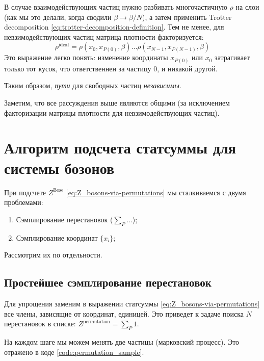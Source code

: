 \begin{lecture}
    В случае взаимодействующих частиц нужно разбивать многочастичную $\rho$ на слои (как мы это делали, когда сводили $\beta \rightarrow \beta /N$), а затем применить Trotter decomposition \eqref{eq:trotter-decomposition-definition}.
    Тем не менее, для невзимодействующих частиц матрица плотности факторизуется:
    \begin{equation}
        \label{eq:rho-bosons-ideal-factorized}
        \rho^{\mathrm{ideal}}=\rho\left(x_{0}, x_{P(0)}, \beta\right) \ldots \rho\left(x_{N-1}, x_{P(N-1)}, \beta\right)
    \end{equation}
    Это выражение легко понять: изменение координаты $x_{P(0)}$ или $x_0$ затрагивает только тот кусок, что ответственнен за частицу 0, и никакой другой.
    
    Таким образом, \textit{пути} для свободных частиц \textit{независимы}.

    Заметим, что все рассуждения выше являются общими (за исключением факторизации матрицы плотности для невзимодействующих частиц).

    \section{Алгоритм подсчета статсуммы для системы бозонов}
    При подсчете $Z^{\text{Bose}}$ \eqref{eq:Z_bosons-via-permutations} мы сталкиваемся с двумя проблемами:
    \begin{enumerate}
        \item Сэмплирование перестановок ($\sum\limits_{P}^{} \dots$);
        \item Сэмплирование координат $\{x_i\}$;
    \end{enumerate}

    Рассмотрим их по отдельности.

    \subsection{Простейшее сэмплирование перестановок}
    Для упрощения заменим в выражении статсуммы \eqref{eq:Z_bosons-via-permutations} все члены, зависящие от координат, единицей.
    Это приведет к задаче поиска $N$ перестановок в списке: $Z^{\text{permutation}} = \sum\limits_{P}^{}1$.

    На каждом шаге мы можем менять две частицы (марковский процесс).
    Это отражено в коде \ref{code:permutation_sample}.



\end{lecture}
